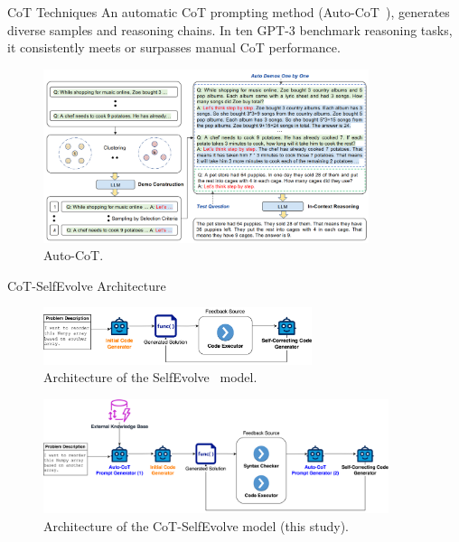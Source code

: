 \begin{frame}{CoT Techniques}
    An automatic CoT prompting method (Auto-CoT~\cite{zhang2022automatic}), generates diverse samples and reasoning chains. In ten GPT-3 benchmark reasoning tasks, it consistently meets or surpasses manual CoT performance.
    \begin{figure}[!htb]
        \centering
        \includegraphics[width=0.85\textwidth]{img/auto_cot}
        \captionsetup{font=small,labelformat=empty}
        \caption{Auto-CoT.}
    \end{figure}
\end{frame}

\begin{frame}{CoT-SelfEvolve Architecture}
    \begin{figure}[!htb]
        \centering
        \includegraphics[width=0.70\textwidth]{img/selfevolve_architecture}
        \captionsetup{font=small,labelformat=empty}
        \caption{Architecture of the SelfEvolve~\cite{jiang2023selfevolve} model.}
    \end{figure}
    \begin{figure}[!htb]
        \centering
        \includegraphics[width=0.90\textwidth]{img/cot_selfevolve_architecture}
        \captionsetup{font=small,labelformat=empty}
        \caption{Architecture of the CoT-SelfEvolve model (this study).}
    \end{figure}
\end{frame}

